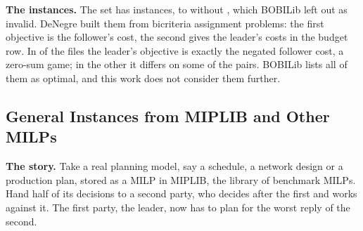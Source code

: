 \textbf{The instances.} The set  has \FamAssignmentAll{} instances,
 to  without , which BOBILib left out as invalid. DeNegre
built them from bicriteria assignment problems:\cite{denegre2011thesis} the first objective is
the follower's cost, the second gives the leader's costs in the budget row. In \NumAssignNegated{} of the files
the leader's objective is exactly the negated follower cost, a zero-sum game; in the other
\NumAssignOther{} it differs on some of the pairs.
BOBILib lists all of them as optimal, and this work does not consider them further.

\subsection{General Instances from MIPLIB and Other MILPs}\label{sec:prob-general}

\textbf{The story.} Take a real planning model, say a schedule, a network design or a
production plan, stored as a MILP in MIPLIB, the library of benchmark MILPs.
Hand half of its decisions to a second party, who decides after the first and works against
it. The first party, the leader, now has to plan for the worst reply of the second.


